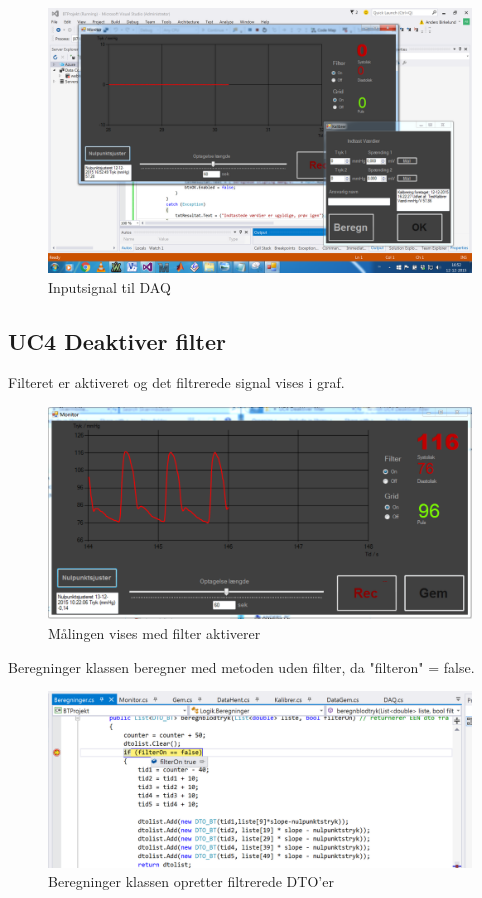 \begin{figure}[H]
	\centering
	\includegraphics[width=1\textwidth]{Figurer/Test_Nul_3}
	\caption{Inputsignal til DAQ}
\end{figure}


\subsection{UC4 Deaktiver filter}

Filteret er aktiveret og det filtrerede signal vises i graf.

\begin{figure}[H]
	\centering
	\includegraphics[width=1\textwidth]{Figurer/Test_Deaktiver_1}
	\caption{Målingen vises med filter aktiverer}
\end{figure}

Beregninger klassen beregner med metoden uden filter, da "filteron" = false.

\begin{figure}[H]
	\centering
	\includegraphics[width=1\textwidth]{Figurer/Test_Deaktiver_2}
	\caption{Beregninger klassen opretter filtrerede DTO'er}
\end{figure}

